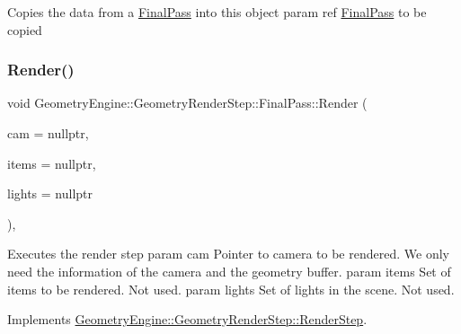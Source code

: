 Copies the data from a \mbox{\hyperlink{class_geometry_engine_1_1_geometry_render_step_1_1_final_pass}{Final\+Pass}} into this object param ref \mbox{\hyperlink{class_geometry_engine_1_1_geometry_render_step_1_1_final_pass}{Final\+Pass}} to be copied \mbox{\label{class_geometry_engine_1_1_geometry_render_step_1_1_final_pass_ad078d0e9d394754dbbd3cff871d72b9f}} 
\subsubsection{\texorpdfstring{Render()}{Render()}}
{\footnotesize\ttfamily void Geometry\+Engine\+::\+Geometry\+Render\+Step\+::\+Final\+Pass\+::\+Render (\begin{DoxyParamCaption}\item[{\mbox{\hyperlink{class_geometry_engine_1_1_geometry_world_item_1_1_geometry_camera_1_1_camera}{Geometry\+World\+Item\+::\+Geometry\+Camera\+::\+Camera}} $\ast$}]{cam = {\ttfamily nullptr},  }\item[{std\+::unordered\+\_\+set$<$ \mbox{\hyperlink{class_geometry_engine_1_1_geometry_world_item_1_1_geometry_item_1_1_geometry_item}{Geometry\+World\+Item\+::\+Geometry\+Item\+::\+Geometry\+Item}} $\ast$ $>$ $\ast$}]{items = {\ttfamily nullptr},  }\item[{std\+::unordered\+\_\+set$<$ \mbox{\hyperlink{class_geometry_engine_1_1_geometry_world_item_1_1_geometry_light_1_1_light}{Geometry\+World\+Item\+::\+Geometry\+Light\+::\+Light}} $\ast$ $>$ $\ast$}]{lights = {\ttfamily nullptr} }\end{DoxyParamCaption})\hspace{0.3cm}{\ttfamily [override]}, {\ttfamily [virtual]}}

Executes the render step param cam Pointer to camera to be rendered. We only need the information of the camera and the geometry buffer. param items Set of items to be rendered. Not used. param lights Set of lights in the scene. Not used. 

Implements \mbox{\hyperlink{class_geometry_engine_1_1_geometry_render_step_1_1_render_step_a9b054ee8f38304319a9d03ba3e173dcd}{Geometry\+Engine\+::\+Geometry\+Render\+Step\+::\+Render\+Step}}.

